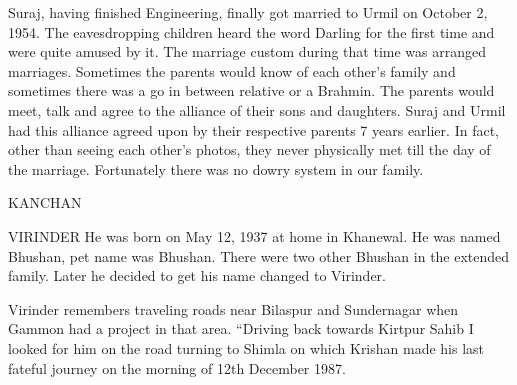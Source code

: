 Suraj, having finished Engineering, finally got married to Urmil on October 2, 1954. The eavesdropping children heard the word Darling for the first time and were quite amused by it. The marriage custom during that time was arranged marriages. Sometimes the parents would know of each other's family and sometimes there was a go in between relative or a Brahmin. The parents would meet, talk and agree to the alliance of their sons and daughters. Suraj and Urmil had this alliance agreed upon by their respective parents 7 years earlier. In fact, other than seeing each other's  photos, they never physically met till the day of the marriage. Fortunately there was no dowry system in our family. 

KANCHAN


VIRINDER 
He was born on May 12, 1937 at home in Khanewal. He was named Bhushan, pet name was Bhushan. There were two other Bhushan in the extended family. Later he decided to get his name changed to Virinder. 

Virinder remembers traveling roads near Bilaspur and Sundernagar when Gammon had a project in that area. 
“Driving back towards Kirtpur Sahib I looked for him on the road turning to Shimla on which Krishan made his last fateful journey on the morning of 12th December 1987. 


